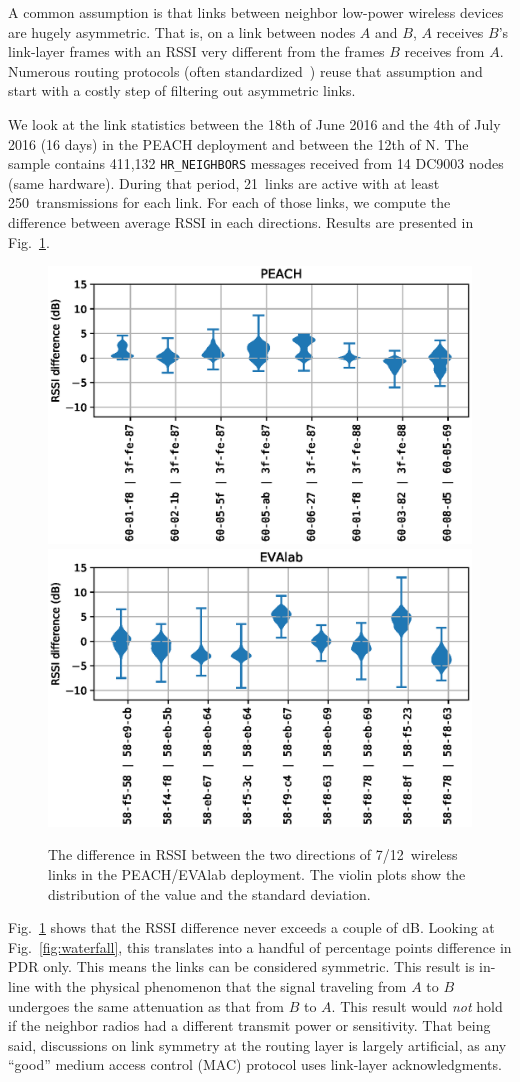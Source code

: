 \documentclass{elsarticle}
\newcommand{\HRNEIGHBORS}         {{\tt HR\_NEIGHBORS}\xspace}
\begin{document}

A common assumption is that links between neighbor low-power wireless devices are hugely asymmetric.
That is, on a link between nodes $A$ and $B$, $A$ receives $B$'s link-layer frames with an RSSI very different from the frames $B$ receives from $A$.
Numerous routing protocols (often standardized~\cite{rfc3626}) reuse that assumption and start with a costly step of filtering out asymmetric links.


We look at the link statistics between the 18th of June 2016 and the 4th of July 2016 (16 days) in the PEACH deployment and between the 12th of N.
The sample contains 411,132 \HRNEIGHBORS messages received from 14 DC9003 nodes (same hardware).
During that period, 21~links are active with at least 250~transmissions for each link.
For each of those links, we compute the difference between average RSSI in each directions.
Results are presented in Fig.~\ref{fig:tab_symmetry}.

\begin{figure}
    \includegraphics[width=0.5\columnwidth]{asymmetry_peach.eps}
    \includegraphics[width=0.5\columnwidth]{asymmetry.eps}
    \caption{
        The difference in RSSI between the two directions of 7/12~wireless links in the PEACH/EVAlab deployment.
        The violin plots show the distribution of the value and the standard deviation.
    }
    \label{fig:tab_symmetry}
\end{figure}


Fig.~\ref{fig:tab_symmetry} shows that the RSSI difference never exceeds a couple of dB.
Looking at Fig.~\ref{fig:waterfall}, this translates into a handful of percentage points difference in PDR only.
This means the links can be considered symmetric.
This result is in-line with the physical phenomenon that the signal traveling from $A$ to $B$ undergoes the same attenuation as that from $B$ to $A$.
This result would \textit{not} hold if the neighbor radios had a different transmit power or sensitivity.
That being said, discussions on link symmetry at the routing layer is largely artificial, as any ``good'' medium access control (MAC) protocol uses link-layer acknowledgments.
\end{document}
